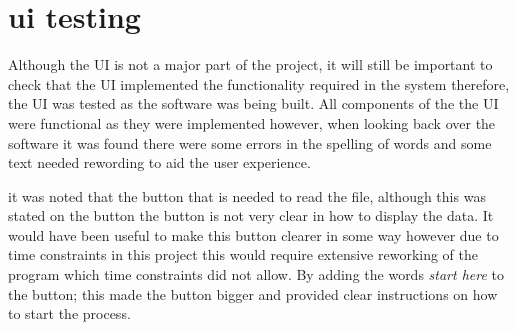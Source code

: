 \section{ui testing}

Although the UI is not a major part of the project, it will still be important to check that the UI implemented the functionality required in the system therefore, the UI was tested as the software was being built. All components of the the UI were functional as they were implemented however, when looking back over the software it was found there were some errors in the spelling of words and some text needed rewording to aid the user experience. 

it was noted that the button that is needed to read the file, although this was stated on the button the button is not very clear in how to display the data. It would have been useful to make this button clearer in some way however due to time constraints in this project this would require extensive reworking of the program which time constraints did not allow. By adding the words \textit{start here} to the button; this made the button bigger and provided clear instructions on how to start the process.